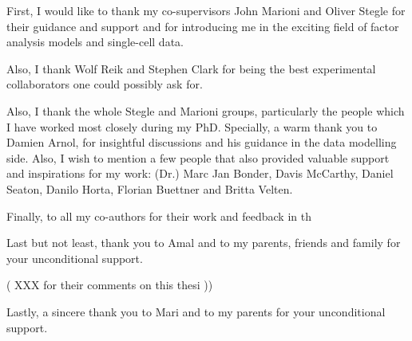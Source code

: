 
\begin{acknowledgements}


First, I would like to thank my co-supervisors John Marioni and Oliver Stegle for their guidance and support and for introducing me in the exciting field of factor analysis models and single-cell data. 

Also, I thank Wolf Reik and Stephen Clark for being the best experimental collaborators one could possibly ask for.

Also, I thank the whole Stegle and Marioni groups, particularly the people which I have worked most closely during my PhD. Specially, a warm thank you to Damien Arnol, for insightful discussions and his guidance in the data modelling side. Also, I wish to mention a few people that also provided valuable support and inspirations for my work: (Dr.) Marc Jan Bonder, Davis McCarthy, Daniel Seaton, Danilo Horta, Florian Buettner and Britta Velten.

Finally, to all my co-authors for their work and feedback in th

Last but not least, thank you to Amal and to my parents, friends and family for your unconditional support.

( XXX for their comments on this thesi ))

Lastly, a sincere thank you to Mari and to my parents for your unconditional support.

\end{acknowledgements}
